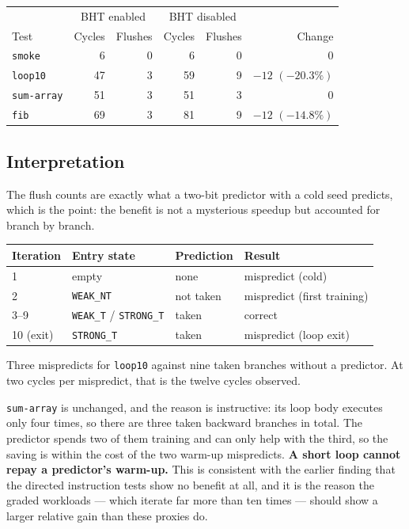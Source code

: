 \documentclass[11pt]{article}
\begin{document}
\begin{center}
\begin{tabular}{lrrrrr}
\hline
 & \multicolumn{2}{c}{BHT enabled} & \multicolumn{2}{c}{BHT disabled} & \\
Test & Cycles & Flushes & Cycles & Flushes & Change \\
\hline
\texttt{smoke}     &  6 & 0 &  6 & 0 &  0 \\
\texttt{loop10}    & 47 & 3 & 59 & 9 & $-12$ \; $(-20.3\%)$ \\
\texttt{sum-array} & 51 & 3 & 51 & 3 &  0 \\
\texttt{fib}       & 69 & 3 & 81 & 9 & $-12$ \; $(-14.8\%)$ \\
\hline
\end{tabular}
\end{center}

\subsection{Interpretation}

The flush counts are exactly what a two-bit predictor with a cold seed predicts, which
is the point: the benefit is not a mysterious speedup but accounted for branch by branch.

\begin{center}
\begin{tabular}{llll}
\hline
Iteration & Entry state & Prediction & Result \\
\hline
1 & empty & none & mispredict (cold) \\
2 & \texttt{WEAK\_NT} & not taken & mispredict (first training) \\
3--9 & \texttt{WEAK\_T} / \texttt{STRONG\_T} & taken & correct \\
10 (exit) & \texttt{STRONG\_T} & taken & mispredict (loop exit) \\
\hline
\end{tabular}
\end{center}

Three mispredicts for \texttt{loop10} against nine taken branches without a predictor.
At two cycles per mispredict, that is the twelve cycles observed.

\texttt{sum-array} is unchanged, and the reason is instructive: its loop body executes
only four times, so there are three taken backward branches in total. The predictor
spends two of them training and can only help with the third, so the saving is within
the cost of the two warm-up mispredicts. \textbf{A short loop cannot repay a predictor's
warm-up.} This is consistent with the earlier finding that the directed instruction
tests show no benefit at all, and it is the reason the graded workloads --- which iterate
far more than ten times --- should show a larger relative gain than these proxies do.
\end{document}
